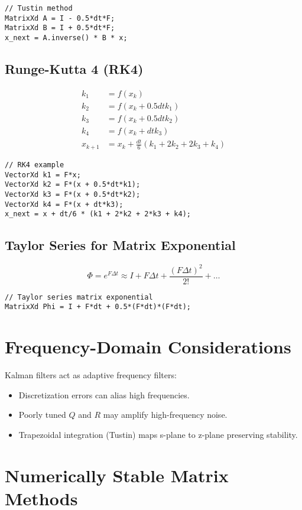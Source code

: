 \documentclass[11pt]{article}
\begin{document}
\begin{lstlisting}
// Tustin method
MatrixXd A = I - 0.5*dt*F;
MatrixXd B = I + 0.5*dt*F;
x_next = A.inverse() * B * x;
\end{lstlisting}

\subsection{Runge-Kutta 4 (RK4)}
\begin{align*}
k_1 &= f(x_k) \\
k_2 &= f(x_k + 0.5 dt k_1) \\
k_3 &= f(x_k + 0.5 dt k_2) \\
k_4 &= f(x_k + dt k_3) \\
x_{k+1} &= x_k + \frac{dt}{6} (k_1 + 2 k_2 + 2 k_3 + k_4)
\end{align*}

\begin{lstlisting}
// RK4 example
VectorXd k1 = F*x;
VectorXd k2 = F*(x + 0.5*dt*k1);
VectorXd k3 = F*(x + 0.5*dt*k2);
VectorXd k4 = F*(x + dt*k3);
x_next = x + dt/6 * (k1 + 2*k2 + 2*k3 + k4);
\end{lstlisting}

\subsection{Taylor Series for Matrix Exponential}
\[
\Phi = e^{F \Delta t} \approx I + F \Delta t + \frac{(F \Delta t)^2}{2!} + \dots
\]

\begin{lstlisting}
// Taylor series matrix exponential
MatrixXd Phi = I + F*dt + 0.5*(F*dt)*(F*dt);
\end{lstlisting}

\section{Frequency-Domain Considerations}
Kalman filters act as adaptive frequency filters:
\begin{itemize}
    \item Discretization errors can alias high frequencies.
    \item Poorly tuned $Q$ and $R$ may amplify high-frequency noise.
    \item Trapezoidal integration (Tustin) maps s-plane to z-plane preserving stability.
\end{itemize}

\section{Numerically Stable Matrix Methods}
\end{document}
